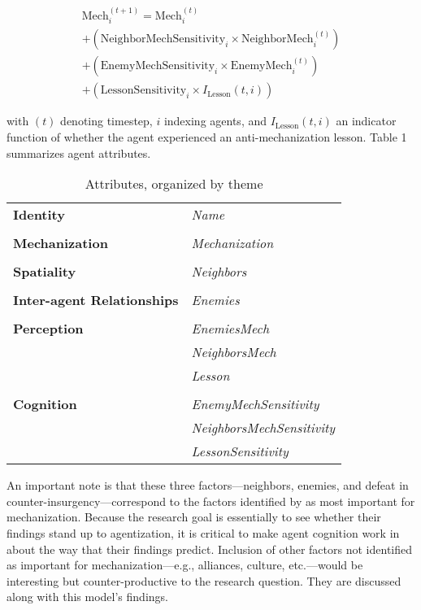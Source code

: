 \documentclass{article}
\begin{document}
\begin{multline}
	\textrm{Mech}_i^{(t+1)} = \textrm{Mech}_i^{(t)} \\ 
	+ (\textrm{NeighborMechSensitivity}_i \times \textrm{NeighborMech}_i^{(t)}) \\
	+ (\textrm{EnemyMechSensitivity}_i \times \textrm{EnemyMech}_i^{(t)}) \\
	+ (\textrm{LessonSensitivity}_i \times I_{\textrm{Lesson}}(t, i))
\end{multline}

with $(t)$ denoting timestep, $i$ indexing agents, and $I_{\textrm{Lesson}}(t,
i)$ an indicator function of whether the agent experienced an anti-mechanization
lesson. Table 1 summarizes agent attributes.

\begin{table}[h]
	\centering
	\caption{Attributes, organized by theme}
	\begin{tabular}{|l l|}
		\hline
		\textbf{Identity} & \textit{Name} \\
		& \\
		\textbf{Mechanization} & \textit{Mechanization} \\
		& \\
		\textbf{Spatiality} & \textit{Neighbors} \\
		& \\
		\textbf{Inter-agent Relationships} & \textit{Enemies} \\
		& \\
		\textbf{Perception} & \textit{EnemiesMech} \\
		& \textit{NeighborsMech} \\
		& \textit{Lesson} \\
		& \\
		\textbf{Cognition} & \textit{EnemyMechSensitivity} \\
		& \textit{NeighborsMechSensitivity} \\
		& \textit{LessonSensitivity} \\
		\hline
	\end{tabular}
\end{table}

An important note is that these three factors---neighbors, enemies, and
defeat in counter-insurgency---correspond to the factors identified by 
\citet{sechser2010army} as most important for mechanization. Because the research
goal is essentially to see whether their findings stand up to agentization,
it is critical to make agent cognition work in about the way that their findings
predict. Inclusion of other factors not identified as important for
mechanization---e.g., alliances, culture, etc.---would be interesting 
but counter-productive to the research
question. They are discussed along with this model's findings. 
\end{document}
